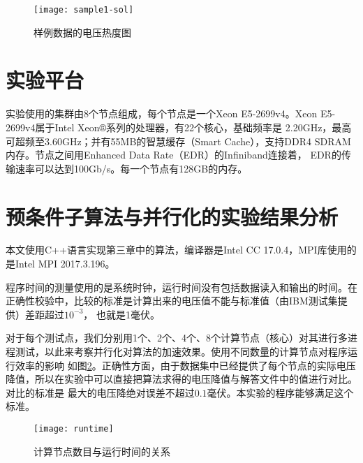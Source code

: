 \begin{figure}[H]
  \texttt{[image: sample1-sol]}
  \caption{样例数据的电压热度图}
  \label{fig:figsample1-sol}
\end{figure}

\section{实验平台}

实验使用的集群由8个节点组成，每个节点是一个Xeon E5-2699v4。Xeon E5-2699v4属于Intel Xeon®系列的处理器，有22个核心，基础频率是
2.20GHz，最高可超频至3.60GHz；并有55MB的智慧缓存（Smart Cache），支持DDR4 SDRAM内存。节点之间用Enhanced Data Rate（EDR）的Infiniband连接着，
EDR的传输速率可以达到100Gb/s。每一个节点有128GB的内存。

\section{预条件子算法与并行化的实验结果分析}

本文使用C++语言实现第三章中的算法，编译器是Intel CC 17.0.4，MPI库使用的是Intel MPI 2017.3.196。

程序时间的测量使用的是系统时钟，运行时间没有包括数据读入和输出的时间。在正确性校验中，比较的标准是计算出来的电压值不能与标准值（由IBM测试集提供）差距超过$10^{-3}$，
也就是1毫伏。

对于每个测试点，我们分别用1个、2个、4个、8个计算节点（核心）对其进行多进程测试，以此来考察并行化对算法的加速效果。使用不同数量的计算节点对程序运行效率的影响
如图\ref{fig:runtime}。正确性方面，由于数据集中已经提供了每个节点的实际电压降值，所以在实验中可以直接把算法求得的电压降值与解答文件中的值进行对比。对比的标准是
最大的电压降绝对误差不超过$0.1$毫伏。本实验的程序能够满足这个标准。

\begin{figure}[H]
  \texttt{[image: runtime]}
  \caption{计算节点数目与运行时间的关系}
  \label{fig:runtime}
\end{figure}

